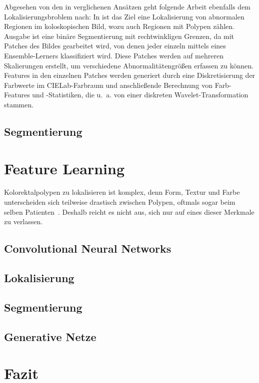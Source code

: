 Abgesehen von den in \cite{Prasath.2016} verglichenen Ansätzen geht folgende Arbeit ebenfalls dem Lokalisierungsbroblem nach:
In \cite{Li.2004} ist das Ziel eine Lokalisierung von abnormalen Regionen im koloskopischen Bild, wozu auch Regionen mit Polypen zählen.
Ausgabe ist eine binäre Segmentierung mit rechtwinkligen Grenzen, da mit Patches des Bildes gearbeitet wird, von denen jeder einzeln mittels eines Ensemble-Lerners klassifiziert wird.
Diese Patches werden auf mehreren Skalierungen erstellt, um verschiedene Abnormalitätengrößen erfassen zu können.
Features in den einzelnen Patches werden generiert durch eine Diskretisierung der Farbwerte im CIELab-Farbraum und anschließende Berechnung von Farb-Features und -Statistiken, die u.~a. von einer diskreten Wavelet-Transformation stammen.



\subsection{Segmentierung}





\section{Feature Learning}

Kolorektalpolypen zu lokalisieren ist komplex, denn Form, Textur und Farbe unterscheiden sich teilweise drastisch zwischen Polypen, oftmals sogar beim selben Patienten~\cite{Prasath.2016}.
Deshalb reicht es nicht aus, sich nur auf eines dieser Merkmale zu verlassen.




\subsection{Convolutional Neural Networks}





\subsection{Lokalisierung}





\subsection{Segmentierung}





\subsection{Generative Netze}





\section{Fazit}


